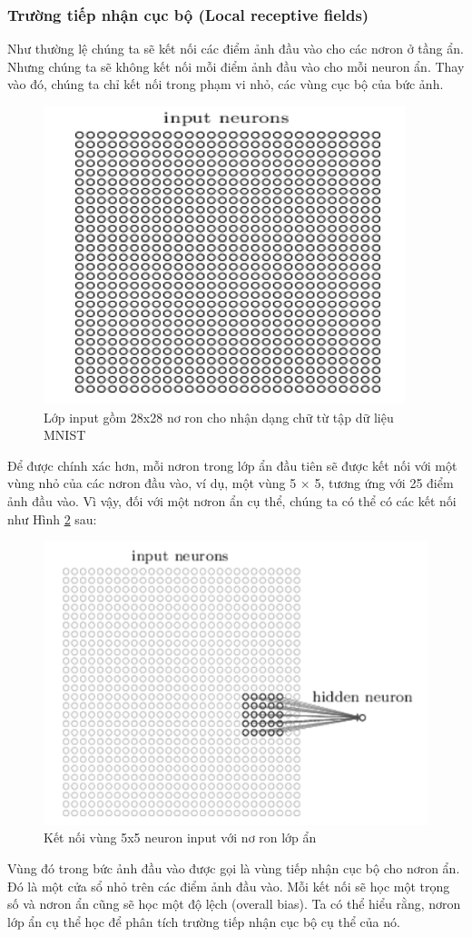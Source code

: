 \subsubsection{Trường tiếp nhận cục bộ (Local receptive fields)}
Như thường lệ chúng ta sẽ kết nối các điểm ảnh đầu vào cho các nơron ở tầng 
ẩn. Nhưng chúng ta sẽ không kết nối mỗi điểm ảnh đầu vào cho mỗi neuron ẩn. Thay 
vào đó, chúng ta chỉ kết nối trong phạm vi nhỏ, các vùng cục bộ của bức ảnh.
\begin{figure}[H]
	\centering
	\includegraphics[width=0.5\linewidth]{images/lopinput.png}
	\caption{Lớp input gồm 28x28 nơ ron cho nhận dạng chữ từ tập dữ liệu MNIST}
	\label{fig:lopinput}
\end{figure}
Để được chính xác hơn, mỗi nơron trong lớp ẩn đầu tiên sẽ được kết nối với 
một vùng nhỏ của các nơron đầu vào, ví dụ, một vùng 5 × 5, tương ứng với 25 điểm ảnh đầu vào. Vì vậy, đối với một nơron ẩn cụ thể, chúng ta có thể có các kết nối như Hình \ref{fig:ketnoivung} sau:
\begin{figure}[H]
	\centering
	\includegraphics[width=0.6\linewidth]{images/ketnoivung.png}
	\caption{Kết nối vùng 5x5 neuron input với nơ ron lớp ẩn}
	\label{fig:ketnoivung}
\end{figure}
Vùng đó trong bức ảnh đầu vào được gọi là vùng tiếp nhận cục bộ cho nơron 
ẩn. Đó là một cửa sổ nhỏ trên các điểm ảnh đầu vào. Mỗi kết nối sẽ học một trọng số
và nơron ẩn cũng sẽ học một độ lệch (overall bias). Ta có thể hiểu rằng, nơron lớp ẩn 
cụ thể học để phân tích trường tiếp nhận cục bộ cụ thể của nó.

